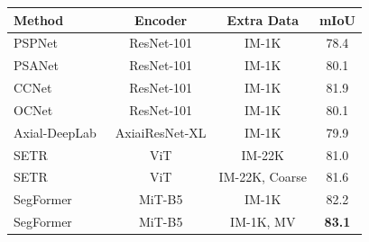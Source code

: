 \begin{tabular}{lccc}
\toprule
\multicolumn{1}{l}{Method} & Encoder & Extra Data & mIoU \\
\midrule
PSPNet~\cite{pspnet} & ResNet-101 & IM-1K & 78.4 \\ %
PSANet~\cite{psanet} & ResNet-101 & IM-1K & 80.1 \\%
CCNet~\cite{ccnet} & ResNet-101 & IM-1K & 81.9 \\ %
OCNet~\cite{ocnet} & ResNet-101 & IM-1K & 80.1 \\%
Axial-DeepLab~\cite{axial} & AxiaiResNet-XL & IM-1K & 79.9 \\ %
SETR~\cite{setr} & ViT & IM-22K & 81.0 \\%
SETR~\cite{setr} & ViT & IM-22K, Coarse & 81.6 \\
\midrule
SegFormer & MiT-B5 & IM-1K & 82.2 \\ %
SegFormer & MiT-B5 & IM-1K, MV & \textbf{83.1} \\
\bottomrule
\end{tabular}
